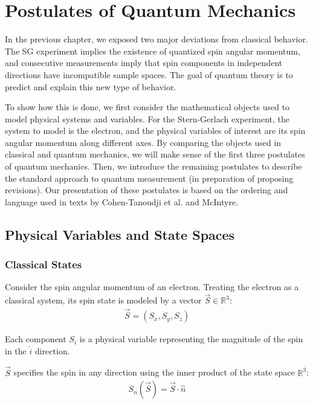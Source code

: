\chapter{Postulates of Quantum Mechanics} \label{Chapter 3}

In the previous chapter, we exposed two major deviations from classical behavior. The SG experiment implies the existence of quantized spin angular momentum, and consecutive measurements imply that spin components in independent directions have incompatible sample spaces. The goal of quantum theory is to predict and explain this new type of behavior.

To show how this is done, we first consider the mathematical objects used to model physical systems and variables. For the Stern-Gerlach experiment, the system to model is the electron, and the physical variables of interest are its spin angular momentum along different axes. By comparing the objects used in classical and quantum mechanics, we will make sense of the first three postulates of quantum mechanics. Then, we introduce the remaining postulates to describe the standard approach to quantum measurement (in preparation of proposing revisions). Our presentation of these postulates is based on the ordering and language used in texts by Cohen-Tanoudji et al. \cite{cohen} and McIntyre\cite{mcintyre}.

\section{Physical Variables and State Spaces}
\subsection{Classical States} \label{classical states}
Consider the spin angular momentum of an electron. Treating the electron as a classical system, its spin state is modeled by a vector $\vec{S} \in \mathbb{R}^3$:
\begin{align}
\vec{S} = (S_x, S_y, S_z)
\end{align}

Each component $S_i$ is a physical variable representing the magnitude of the spin in the $\hat{i}$ direction.

$\vec{S}$ specifies the spin in any direction using the inner product of the state space $\mathbb{R}^3$:
\begin{align}
S_n(\vec{S}) = \vec{S} \cdot \hat{n}
\end{align}

